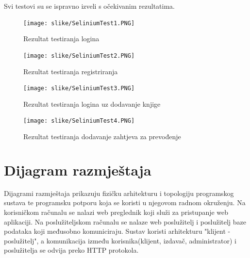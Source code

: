 			

            Svi testovi su se ispravno izveli s očekivanim rezultatima. 
            
			
			
			\begin{figure}[H]
				\texttt{[image: slike/SeliniumTest1.PNG]} %
				\centering
				\caption{Rezultat testiranja logina }
				\label{fig:loginTest1}
			\end{figure}
			
			
			
			\begin{figure}[H]
				\texttt{[image: slike/SeliniumTest2.PNG]} %
				\centering
				\caption{Rezultat testiranja registriranja }
				\label{fig:registerTest1}
			\end{figure}
			
			
			
			\begin{figure}[H]
				\texttt{[image: slike/SeliniumTest3.PNG]} %
				\centering
				\caption{Rezultat testiranja logina uz dodavanje knjige}
				\label{fig:addBookTest1}
			\end{figure}
			
			
			
			\begin{figure}[H]
				\texttt{[image: slike/SeliniumTest4.PNG]} %
				\centering
				\caption{Rezultat testiranja dodavanje zahtjeva za prevođenje}
				\label{fig:testTranslationRequest1}
			\end{figure}
			
			\eject
		
		
		
		\section{Dijagram razmještaja}
			
			Dijagrami razmještaja prikazuju fizičku arhitekturu i topologiju programskog sustava te programsku potporu koja se koristi u njegovom radnom okruženju. Na korisničkom računalu se nalazi web preglednik koji služi za pristupanje web aplikaciji. Na poslužiteljskom računalu se nalaze web poslužitelj i poslužitelj baze podataka koji međusobno komuniciraju. Sustav koristi arhitekturu "klijent - poslužitelj", a komunikacija između korisnika(klijent, izdavač, administrator) i poslužitelja se odvija preko HTTP protokola.
			

